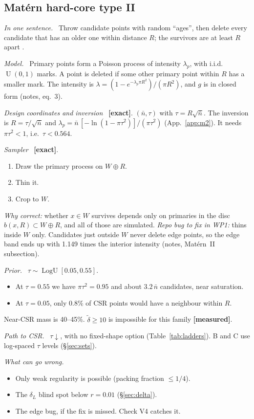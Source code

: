 \documentclass[10pt,a4paper]{article}
\newcommand{\code}[1]{\texttt{\detokenize{#1}}}
\newcommand{\exact}{\textcolor{green!45!black}{\textbf{[exact]}}}
\newcommand{\measured}{\textcolor{green!45!black}{\textbf{[measured]}}}
\newcommand{\nbar}{\bar n}
\newcommand{\dtil}{\tilde\delta}
\newcommand{\LogU}{\operatorname{LogU}}
\newcommand{\Unif}{\operatorname{U}}
\newcommand{\sub}[1]{\par\textit{#1}\ }
\begin{document}
\subsection{Mat\'ern hard-core type II}\label{sec:m2}
\sub{In one sentence.} Throw candidate points with random ``ages'', then delete every candidate that has an older one within distance $R$; the survivors are at least $R$ apart \citep{Matern1986}.
\sub{Model.} Primary points form a Poisson process of intensity $\lambda_p$, with i.i.d.\ $\Unif(0,1)$ marks. A point is deleted if some other primary point within $R$ has a smaller mark. The intensity is $\lambda=(1-e^{-\lambda_p\pi R^2})/(\pi R^2)$, and $g$ is in closed form (notes, eq.~3).
\sub{Design coordinates and inversion} \exact. $(\nbar,\tau)$ with $\tau=R\sqrt{\nbar}$. The inversion is $R=\tau/\sqrt{\nbar}$ and $\lambda_p=\nbar\,[-\ln(1-\pi\tau^2)]/(\pi\tau^2)$ (App.~\ref{app:m2}). It needs $\pi\tau^2<1$, i.e.\ $\tau<0.564$.
\sub{Sampler} \exact.
\begin{enumerate}
  \item Draw the primary process on $W\oplus R$.
  \item Thin it.
  \item Crop to $W$.
\end{enumerate}
\emph{Why correct:} whether $x\in W$ survives depends only on primaries in the disc $b(x,R)\subset W\oplus R$, and all of those are simulated. \emph{Repo bug to fix in WP1:} \code{matern.py:34-52} thins inside $W$ only. Candidates just outside $W$ never delete edge points, so the edge band ends up with 1.149 times the interior intensity (notes, Mat\'ern~II subsection).
\sub{Prior.} $\tau\sim\LogU[0.05,0.55]$.
\begin{itemize}
  \item At $\tau=0.55$ we have $\pi\tau^2=0.95$ and about $3.2\,\nbar$ candidates, near saturation.
  \item At $\tau=0.05$, only 0.8\% of CSR points would have a neighbour within $R$.
\end{itemize}
Near-CSR mass is 40--45\%. $\dtil\ge10$ is impossible for this family \measured.
\sub{Path to CSR.} $\tau\downarrow$, with no fixed-shape option (Table~\ref{tab:ladders}). B and C use log-spaced $\tau$ levels (\S\ref{sec:sets}).
\sub{What can go wrong.}
\begin{itemize}
  \item Only weak regularity is possible (packing fraction $\le1/4$).
  \item The $\delta_L$ blind spot below $r=0.01$ (\S\ref{sec:delta}).
  \item The edge bug, if the fix is missed. Check V4 catches it.
\end{itemize}
\end{document}
